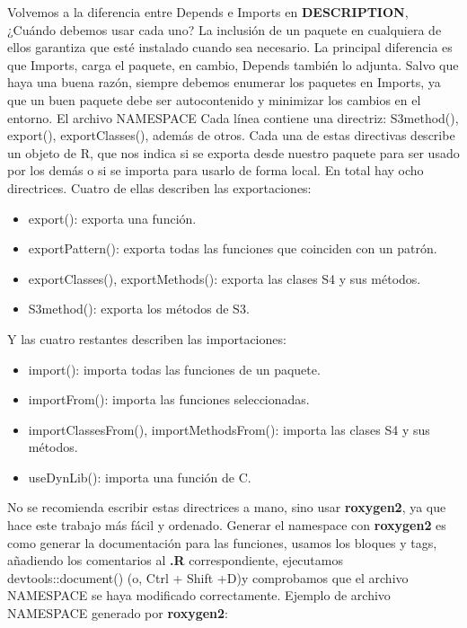 Volvemos a la diferencia entre Depends e Imports en \textbf{DESCRIPTION}, ¿Cu\'ando debemos
usar cada uno?
La inclusi\'on de un paquete en cualquiera de ellos garantiza que est\'e instalado cuando sea
necesario. La principal diferencia es que Imports, carga el paquete, en cambio, Depends
tambi\'en lo adjunta.
Salvo que haya una buena raz\'on, siempre debemos enumerar los paquetes en Imports, ya
que un buen paquete debe ser autocontenido y minimizar los cambios en el entorno.
El archivo NAMESPACE
Cada l\'inea contiene una directriz: S3method(), export(), exportClasses(), adem\'as de otros.
Cada una de estas directivas describe un objeto de R, que nos indica si se exporta desde
nuestro paquete para ser usado por los dem\'as o si se importa para usarlo de forma local.
En total hay ocho directrices. Cuatro de ellas describen las exportaciones:

\begin{itemize}
    \item export(): exporta una funci\'on.
    \item exportPattern(): exporta todas las funciones que coinciden con un patr\'on.
    \item exportClasses(), exportMethods(): exporta las clases S4 y sus m\'etodos.
    \item S3method(): exporta los m\'etodos de S3.
\end{itemize}

Y las cuatro restantes describen las importaciones:
\begin{itemize}
    \item import(): importa todas las funciones de un paquete.
    \item importFrom(): importa las funciones seleccionadas.
    \item importClassesFrom(), importMethodsFrom(): importa las clases S4 y sus
m\'etodos.
    \item useDynLib(): importa una funci\'on de C.
\end{itemize}

No se recomienda escribir estas directrices a mano, sino usar \textbf{roxygen2}, ya que hace este
trabajo m\'as f\'acil y ordenado.
Generar el namespace con \textbf{roxygen2} es como generar la documentaci\'on para las funciones,
usamos los bloques y tags, a\~nadiendo los comentarios al \textbf{.R} correspondiente, ejecutamos
devtools::document() (o, Ctrl + Shift +D)y comprobamos que el archivo NAMESPACE se
haya modificado correctamente.
Ejemplo de archivo NAMESPACE generado por \textbf{roxygen2}:

